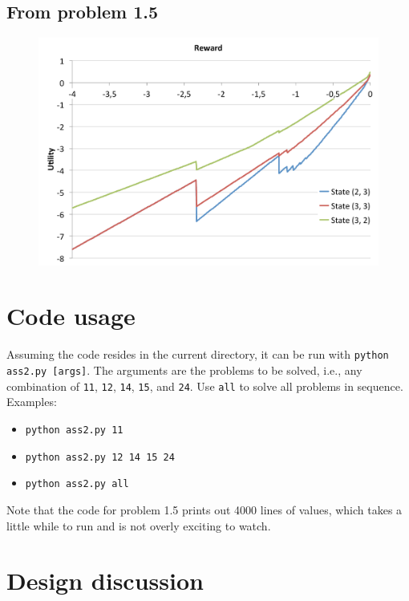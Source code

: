 \documentclass[letterpaper, 10pt]{article}
\begin{document}
\clearpage

\subsection{From problem 1.5}
\label{ssec:prob15fig}
\vfill
\begin{figure}[h]
	\centering
	\includegraphics[width=\textwidth]{prob15}
	\caption{}
	\label{fig:prob15}
\end{figure}
\vfill

\section{Code usage}
Assuming the code resides in the current directory, it can be run with \texttt{python ass2.py [args]}. 
The arguments are the problems to be solved, i.e., any combination of \texttt{11}, \texttt{12}, \texttt{14}, \texttt{15}, and \texttt{24}. Use \texttt{all} to solve all problems in sequence. 
Examples:
\begin{itemize}
\item \texttt{python ass2.py 11}
\item \texttt{python ass2.py 12 14 15 24}
\item \texttt{python ass2.py all}
\end{itemize}
Note that the code for problem 1.5 prints out 4000 lines of values, which takes a little while to run and is not overly exciting to watch. 

\section{Design discussion}
\end{document}
